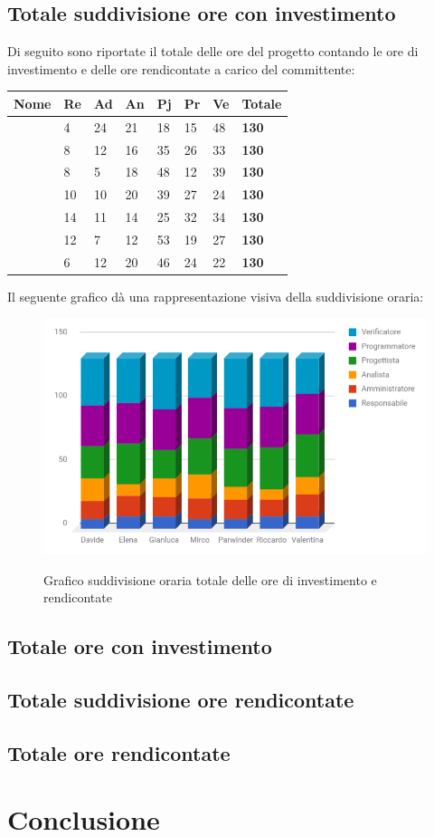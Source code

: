 \documentclass[PianoDiProgetto.tex]{subfiles}
\begin{document}
\subsection{Totale suddivisione ore con investimento}
Di seguito sono riportate il totale delle ore del progetto contando le ore di investimento e delle ore rendicontate a carico del committente:
\begin{table}[htbp]
	\centering
	\renewcommand\arraystretch{1.5}
	\begin{tabularx}{\textwidth}{p{4cm}|p{1cm}|p{1cm}|p{1cm}|p{1cm}|p{1cm}|p{1cm}|p{2cm}}
		\hline
		\textbf{Nome} & \textbf{Re} & \textbf{Ad} & \textbf{An} & \textbf{Pj} & \textbf{Pr} & \textbf{Ve} & \textbf{Totale} \\
		\hline
		\Davide & 4 & 24 & 21 & 18 & 15 & 48 & \textbf{130} \\
		\hline
		\Elena & 8 & 12 & 16 & 35 & 26 & 33 & \textbf{130} \\
		\hline
		\Gianluca & 8 & 5 & 18 & 48 & 12 & 39 & \textbf{130} \\
		\hline
		\Mirco & 10 & 10 & 20 & 39 & 27 & 24 & \textbf{130} \\
		\hline
		\Parwinder & 14 & 11 & 14 & 25 & 32 & 34 & \textbf{130} \\
		\hline
		\Riccardo & 12 & 7 & 12 & 53 & 19 & 27 & \textbf{130} \\
		\hline
		\Valentina & 6 & 12 & 20 & 46 & 24 & 22 & \textbf{130} \\
		\hline
	\end{tabularx}
\end{table}
\newpage
Il seguente grafico dà una rappresentazione visiva della suddivisione oraria:
\begin{figure}
	\includegraphics[width=14.5cm]{images/prospettoOrario/totale.png}
	\label{fig:foo}
	\caption{Grafico suddivisione oraria totale delle ore di investimento e rendicontate}
\end{figure} 
\newpage
\subsection{Totale ore con investimento}
\subsection{Totale suddivisione ore rendicontate}
\subsection{Totale ore rendicontate}

\section{Conclusione}
\end{document}
